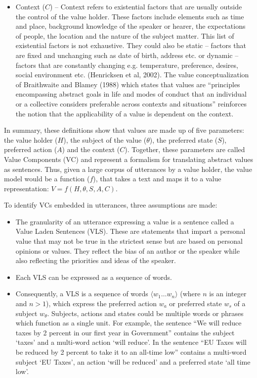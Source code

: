 \begin{itemize}
\item
Context ($C$) -- Context refers to existential factors that are usually outside the control of the value holder. These factors include elements such as time and place, background knowledge of the speaker or hearer, the expectations of people, the location and the nature of the subject matter. This list of existential factors is not exhaustive. They could also be static -- factors that are fixed and unchanging such as date of birth, address etc. or dynamic -- factors that are constantly changing e.g. temperature, preference, desires, social environment etc. (Henricksen et al, 2002). The value conceptualization of Braithwaite and Blamey (1988) which states that values are ``principles encompassing abstract goals in life and modes of conduct that an individual or a collective considers preferable across contexts and situations'' reinforces the notion that the applicability of a value is dependent on the context. 
\end{itemize}

In summary, these definitions show that values are made up of five parameters: the value holder ($H$), the subject of the value ($\theta$), the preferred state ($S$), preferred action ($A$) and the context ($C$). Together, these parameters are called Value Components (VC) and represent a formalism for translating abstract values as sentences. Thus, given a large corpus of utterances by a value holder, the value model would be a function ($f$), that takes a text and maps it to a value representation: $V = f(H,\theta,S,A,C)$.


To identify VCs embedded in utterances, three assumptions are made: 
\begin{itemize}
\item
The granularity of an utterance  expressing a value is a sentence called a Value Laden Sentences (VLS). These are statements that impart a personal value that may not be true in the strictest sense but are based on personal opinions or values. They reflect the bias of an author or the speaker while also reflecting the priorities and ideas of the speaker.
\item
Each VLS can be expressed as a sequence of words.
\item
Consequently, a VLS is a sequence of words $\langle w_1 \ldots w_n\rangle$ (where $n$ is an integer and $n > 1$), which express the preferred action $w_a$ or preferred state $w_s$ of a subject $w_\theta$. Subjects, actions and states could be multiple words or phrases which function as a single unit. For example, the sentence ``We will reduce taxes by 2 percent in our first year in Government'' contains the subject `taxes' and a multi-word action `will reduce'. In the sentence ``EU Taxes will be reduced by 2 percent to take it to an all-time low'' contains a multi-word subject `EU Taxes', an action `will be reduced' and a preferred state `all time low'.
\end{itemize}


